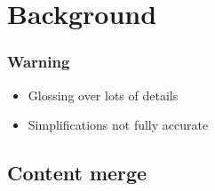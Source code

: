 \documentclass[compress,t]{beamer}
\begin{document}
\section[Background]{Background}

\begin{frame}
  \frametitle{Warning}

  \vfill
  \begin{center}
    \begin{minipage}{0.55\textwidth}
    \begin{itemize}
      \item Glossing over lots of details
      \item Simplifications not fully accurate
    \end{itemize}
    \end{minipage}
  \end{center}
\end{frame}

\subsection{Content merge}
\end{document}
